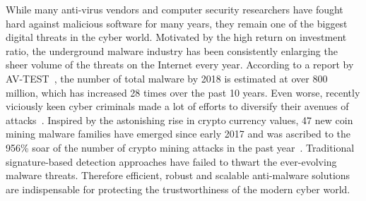 
\label{DL:SubSec:MC}
While many anti-virus vendors and computer security researchers have fought hard against malicious software for many years,
they remain one of the biggest digital threats in the cyber world.
Motivated by the high return on investment ratio,
the underground malware industry has been consistently enlarging the sheer volume of the threats on the Internet every year.
According to a report by AV-TEST~\cite{AvTest}, the number of total malware by 2018 is estimated at over 800 million,
which has increased 28 times over the past 10 years.
Even worse, recently viciously keen cyber criminals made a lot of efforts to diversify their avenues of attacks~\cite{SymantecReport}.
Inspired by the astonishing rise in crypto currency values,
47 new coin mining malware families have emerged since early 2017 and was ascribed to the 956\% soar of the number of crypto mining attacks in the past year~\cite{CryptoMiningAttacks}.
Traditional signature-based detection approaches have failed to thwart the ever-evolving malware threats.
Therefore efficient, robust and scalable anti-malware solutions are indispensable for protecting the trustworthiness of the modern cyber world.

